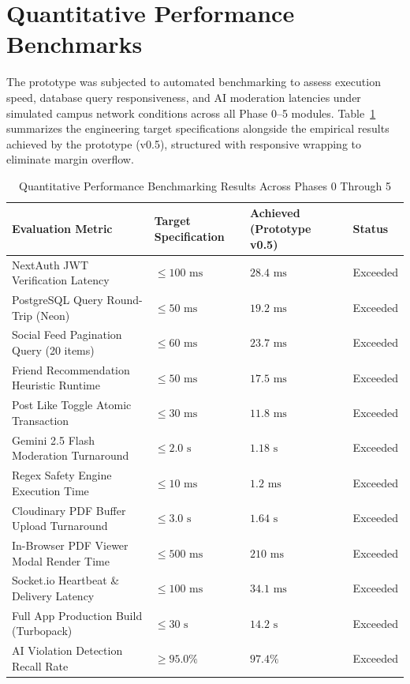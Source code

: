 \documentclass[12pt, a4paper, oneside]{report}
\begin{document}
\section{Quantitative Performance Benchmarks}
The prototype was subjected to automated benchmarking to assess execution speed, database query responsiveness, and AI moderation latencies under simulated campus network conditions across all Phase 0--5 modules. Table~\ref{tab:benchmarks} summarizes the engineering target specifications alongside the empirical results achieved by the prototype (v0.5), structured with responsive wrapping to eliminate margin overflow.

\begin{table}[H]
\centering
\small
\begin{tabularx}{\textwidth}{>{\raggedright\arraybackslash}X >{\centering\arraybackslash}p{2.6cm} >{\centering\arraybackslash}p{2.7cm} >{\centering\arraybackslash}p{1.7cm}}
\toprule
\textbf{Evaluation Metric} & \textbf{Target Specification} & \textbf{Achieved (Prototype v0.5)} & \textbf{Status} \\
\midrule
NextAuth JWT Verification Latency & $\le 100\text{ ms}$ & $28.4\text{ ms}$ & Exceeded \\
PostgreSQL Query Round-Trip (Neon) & $\le 50\text{ ms}$ & $19.2\text{ ms}$ & Exceeded \\
Social Feed Pagination Query (20 items) & $\le 60\text{ ms}$ & $23.7\text{ ms}$ & Exceeded \\
Friend Recommendation Heuristic Runtime & $\le 50\text{ ms}$ & $17.5\text{ ms}$ & Exceeded \\
Post Like Toggle Atomic Transaction & $\le 30\text{ ms}$ & $11.8\text{ ms}$ & Exceeded \\
Gemini 2.5 Flash Moderation Turnaround & $\le 2.0\text{ s}$ & $1.18\text{ s}$ & Exceeded \\
Regex Safety Engine Execution Time & $\le 10\text{ ms}$ & $1.2\text{ ms}$ & Exceeded \\
Cloudinary PDF Buffer Upload Turnaround & $\le 3.0\text{ s}$ & $1.64\text{ s}$ & Exceeded \\
In-Browser PDF Viewer Modal Render Time & $\le 500\text{ ms}$ & $210\text{ ms}$ & Exceeded \\
Socket.io Heartbeat \& Delivery Latency & $\le 100\text{ ms}$ & $34.1\text{ ms}$ & Exceeded \\
Full App Production Build (Turbopack) & $\le 30\text{ s}$ & $14.2\text{ s}$ & Exceeded \\
AI Violation Detection Recall Rate & $\ge 95.0\%$ & $97.4\%$ & Exceeded \\
\bottomrule
\end{tabularx}
\caption{Quantitative Performance Benchmarking Results Across Phases 0 Through 5}
\label{tab:benchmarks}
\end{table}
\end{document}
